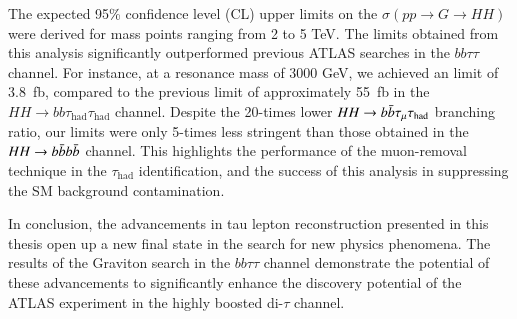 The expected 95\% confidence level (CL) upper limits on the \(\sigma(pp \rightarrow G \rightarrow HH)\) were derived for mass 
points ranging from 2 to 5 TeV. The limits obtained from this analysis significantly outperformed 
previous ATLAS searches in the \(bb\tau\tau\) channel. For instance, at a resonance mass of 3000 GeV, we achieved 
an limit of 3.8~fb, compared to the previous limit of approximately 55~fb in the 
\(HH \rightarrow bb\tau_{\text{had}}\tau_{\text{had}}\) channel. Despite the 20-times lower $HH\rightarrow b\bar{b}\tau_\mathrm{\mu}\tau_{\text{had}}$ branching ratio,
our limits were only 5-times less stringent than those obtained in the $HH\rightarrow b\bar{b}b\bar{b}$ channel. This highlights the
performance of the muon-removal technique in the $\tau_{\text{had}}$ identification, and the success of this analysis in
suppressing the SM background contamination.

In conclusion, the advancements in tau lepton reconstruction presented in this thesis 
open up a new final state in the search for new physics phenomena. 
The results of the Graviton search in the \(bb\tau\tau\) channel
demonstrate the potential of these advancements to significantly enhance the discovery potential of the ATLAS experiment
in the highly boosted di-$\tau$ channel.